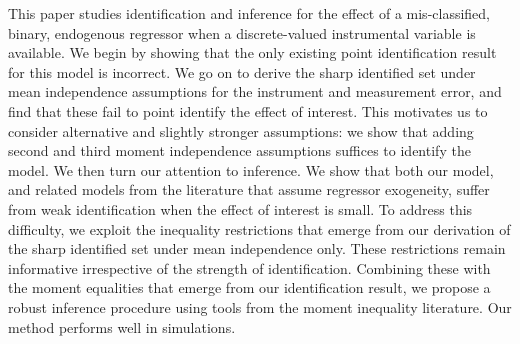 This paper studies identification and inference for the effect of a mis-classified, binary, endogenous regressor when a discrete-valued instrumental variable is available. 
We begin by showing that the only existing point identification result for this model is incorrect. 
We go on to derive the sharp identified set under mean independence assumptions for the instrument and measurement error, and find that these fail to point identify the effect of interest.
This motivates us to consider alternative and slightly stronger assumptions: we show that adding second and third moment independence assumptions suffices to identify the model.
We then turn our attention to inference.
We show that both our model, and related models from the literature that assume regressor exogeneity, suffer from weak identification when the effect of interest is small.
To address this difficulty, we exploit the inequality restrictions that emerge from our derivation of the sharp identified set under mean independence only.
These restrictions remain informative irrespective of the strength of identification.
Combining these with the moment equalities that emerge from our identification result, we propose a robust inference procedure using tools from the moment inequality literature.
Our method performs well in simulations.
